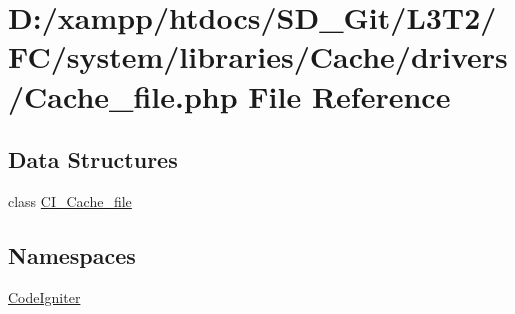 \hypertarget{system_2libraries_2_cache_2drivers_2_cache__file_8php}{}\section{D\+:/xampp/htdocs/\+S\+D\+\_\+\+Git/\+L3\+T2/\+F\+C/system/libraries/\+Cache/drivers/\+Cache\+\_\+file.php File Reference}
\label{system_2libraries_2_cache_2drivers_2_cache__file_8php}
\subsection*{Data Structures}
\begin{DoxyCompactItemize}
\item 
class \hyperlink{class_c_i___cache__file}{C\+I\+\_\+\+Cache\+\_\+file}
\end{DoxyCompactItemize}
\subsection*{Namespaces}
\begin{DoxyCompactItemize}
\item 
 \hyperlink{namespace_code_igniter}{Code\+Igniter}
\end{DoxyCompactItemize}

